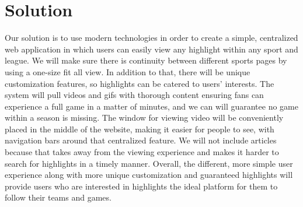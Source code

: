 \section{Solution}
\par Our solution is to use modern technologies in order to create a simple, centralized web application in which users can easily view any highlight within any sport and league. We will make sure there is continuity between different sports pages by using a one-size fit all view. In addition to that, there will be unique customization features, so highlights can be catered to users’ interests. The system will pull videos and gifs with thorough content ensuring fans can experience a full game in a matter of minutes, and we can will guarantee no game within a season is missing. The window for viewing video will be conveniently placed in the middle of the website, making it easier for people to see, with navigation bars around that centralized feature. We will not include articles because that takes away from the viewing experience and makes it harder to search for highlights in a timely manner. Overall, the different, more simple user experience along with more unique customization and guaranteed highlights will provide users who are interested in highlights the ideal platform for them to follow their teams and games. 
